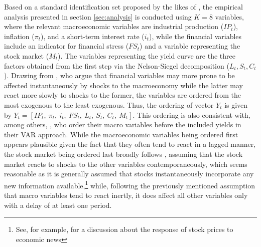 Based on a standard identification set proposed by the likes of \citet{Furlanetto_2017}, the empirical analysis presented in section \ref{sec:analysis} is conducted using $K=8$ variables, where the relevant macroeconomic variables are industrial production ($IP_t$), inflation ($\pi_t$), and a short-term interest rate ($i_t$), while the financial variables include an indicator for financial stress ($FS_t$) and a variable representing the stock market ($M_t$). 
The variables representing the yield curve are the three factors obtained from the first step via the Nelson-Siegel decomposition ($L_t, S_t, C_t$). 
Drawing from \citet{martins2010level}, who argue that financial variables may more prone to be affected instantaneously by shocks to the macroeconomy while the latter may react more slowly to shocks to the former, the variables are ordered from the most exogenous to the least exogenous. Thus, the ordering of vector $Y_{t}$ is given by
$Y_{t} = [IP_{t}, \ \pi_{t}, \ i_{t}, \ FS_{t}, \ L_{t}, \ S_{t}, \ C_{t}, \ M_{t}]$.
This ordering is also consistent with, among others, \citet{ang2003no}, who order their macro variables before the included yields in their VAR approach. 
While the macroeconomic variables being ordered first appears plausible given the fact that they often tend to react in a lagged manner, the stock market being ordered last broadly follows \citet{kilian2009impact}, assuming that the stock market reacts to shocks to the other variables contemporaneously, which seems reasonable as it is generally assumed 
that stocks instantaneously incorporate any new information available,\footnote{See, for example, \citet{pearce1984stock, beaudry2006stock, ormos2011impacts} for a discussion about the response of stock prices to economic news} while, following the previously mentioned assumption that macro variables tend to react inertly, it does affect all other variables only with a delay of at least one period.





